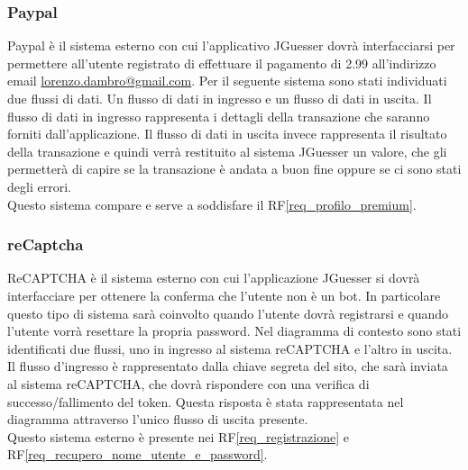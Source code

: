 \subsubsection{Paypal}
Paypal è il sistema esterno con cui l'applicativo JGuesser dovrà interfacciarsi per permettere all'utente registrato di effettuare il pagamento di 2.99\EUR{} all'indirizzo email \href{mailto:lorenzo.dambro@gmail.com}{lorenzo.dambro@gmail.com}. Per il seguente sistema sono stati individuati due flussi di dati. Un flusso di dati in ingresso e un flusso di dati in uscita. Il flusso di dati in ingresso rappresenta i dettagli della transazione che saranno forniti dall'applicazione. Il flusso di dati in uscita invece rappresenta il risultato della transazione e quindi verrà restituito al sistema JGuesser un valore, che gli permetterà di capire se la transazione è andata a buon fine oppure se ci sono stati degli errori. \\
Questo sistema compare e serve a soddisfare il RF\ref{req_profilo_premium}.

\subsubsection{reCaptcha}
ReCAPTCHA è il sistema esterno con cui l'applicazione JGuesser si dovrà interfacciare per ottenere la conferma che l'utente non è un bot. In particolare questo tipo di sistema sarà coinvolto quando l'utente dovrà registrarsi e quando l'utente vorrà resettare la propria password. Nel diagramma di contesto sono stati identificati due flussi, uno in ingresso al sistema reCAPTCHA e l'altro in uscita. Il flusso d'ingresso è rappresentato dalla chiave segreta del sito, che sarà inviata al sistema reCAPTCHA, che dovrà rispondere con una verifica di successo/fallimento del token. Questa risposta è stata rappresentata nel diagramma attraverso l'unico flusso di uscita presente. \\
Questo sistema esterno è presente nei RF\ref{req_registrazione} e RF\ref{req_recupero_nome_utente_e_password}.

